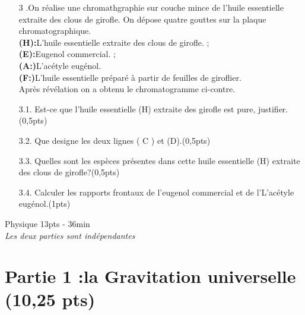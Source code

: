 \documentclass[12pt]{article}
\begin{document}
\begin{enumerate}


		\begin{enumerate}
			\item[3].On réalise une chromathgraphie sur couche mince de l’huile essentielle extraite des clous de girofle. On
dépose quatre gouttes sur la plaque chromatographique.\\\textbf{(H):}L’huile essentielle extraite des clous de girofle. ; 
\\\textbf{(E):}Eugenol commercial. ; \\\textbf{(A:)}L’acétyle eugénol.
\\\textbf{(F:)}L’huile essentielle préparé à partir de feuilles de giroflier.
\\Après révélation on a obtenu le chromatogramme ci-contre.

\item[3.1.]Est-ce que l’huile essentielle (H) extraite des girofle est pure, justifier.\dotfill(0,5pts)
\item[3.2.]Que designe les deux lignes ( C ) et (D).\dotfill(0,5pts)
\item[3.3.]Quelles sont les espèces présentes dans cette huile essentielle (H) extraite des clous de girofle?\dotfill(0,5pts)

\item[3.4.]Calculer les rapports frontaux de l’eugenol commercial et de l’L’acétyle
eugénol.\dotfill(1pts) 
		\end{enumerate}
\end{enumerate}


\begin{center}
\hrulefill
\Large{Physique 13pts - 36min}
\hrulefill\\
    \emph{Les deux parties sont indépendantes}
\end{center}

 \section*{Partie 1 :la Gravitation universelle \dotfill(10,25 pts)}
\end{document}
